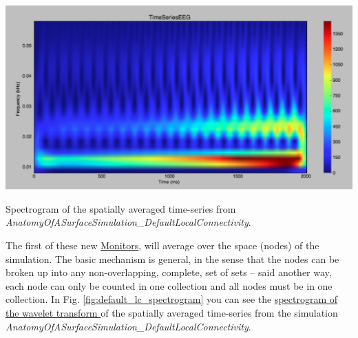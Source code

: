 \documentclass{tufte-handout}
\begin{document}
\begin{marginfigure}
 \includegraphics[width=\linewidth]{Handout_UI_BuildingYourOwnBrainNetworkModel_DefaultLocalConnectivityWaveletSpectrogram.png}%
  \caption{Spectrogram of the spatially averaged time-series from \textit{AnatomyOfASurfaceSimulation\_DefaultLocalConnectivity}.}%
  \label{fig:default_lc_spectrogram}%
\end{marginfigure}

The first of these new \underline{Monitors},  will average over the
space (nodes) of the simulation.  The basic
mechanism is general, in the sense that the nodes can be broken up into any
non-overlapping, complete, set of sets -- said another way, each node can only
be counted in one collection and all nodes must be in one collection.   In Fig. \ref{fig:default_lc_spectrogram} you can see the \underline{spectrogram of the wavelet transform } of the spatially averaged time-series from 
the simulation \textit{AnatomyOfASurfaceSimulation\_DefaultLocalConnectivity}. 



\end{document}
